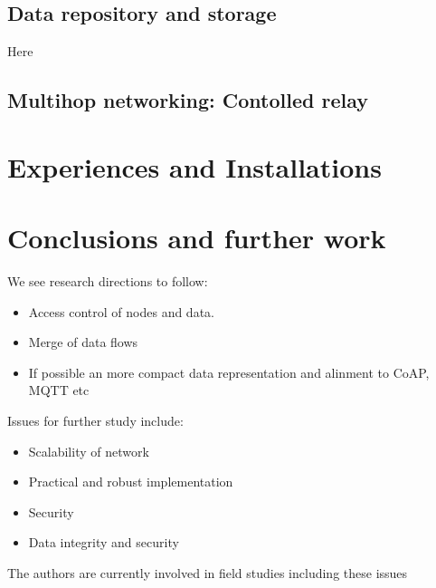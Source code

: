 \documentclass[conference, a4paper,10pt,twocolumn]{IEEEtran}
\begin{document}
\subsection{Data repository and storage}
Here

\subsection{Multihop networking: Contolled relay}

\section{Experiences and Installations}
\label{sec:experince}

\section{Conclusions and further work}
\label{sec:conclusion}

We see research directions to follow:

\begin{itemize}
\item Access control of nodes and data. 

\item Merge of data flows 

\item If possible an more compact data representation and alinment to CoAP, MQTT etc

\end{itemize}

Issues for further study include: 

\begin{itemize}
\item Scalability of network
\item Practical and robust implementation
\item Security
\item Data integrity and security

\end{itemize} 

The authors are currently involved in field studies including these issues
\end{document}
